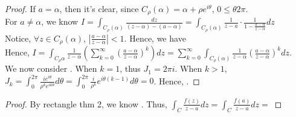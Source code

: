 \documentclass[12pt,a4paper]{article}
\begin{document}
\begin{proof}
  If $a = \alpha$, then it's clear, since $C_\rho(\alpha) = \alpha + \rho e^{i \theta}$, $0 \leq \theta 2\pi$. \\

  \noindent For $a \neq \alpha$, we know $\boxed{I = \int_{C_\rho(\alpha)} \frac{dz}{(z - \alpha) - (a - \alpha)} = \int_{C_\rho(\alpha)} \frac{1}{z - a} \cdot \frac{1}{1 - \frac{a - \alpha}{z - \alpha}} dz}$ \\

  \noindent Notice, $\forall z \in C_\rho(\alpha)$, $|\frac{a - \alpha}{z - \alpha}| < 1$. Hence, we have  \\

  \noindent Hence, $I = \int_{C_\rho{\alpha}} \frac{1}{z - \alpha}(\sum_{k = 0}^\infty (\frac{a - \alpha}{z - \alpha})^k) dz = \sum_{k = 0}^\infty \int_{C_\rho(\alpha)} \frac{1}{z - \alpha} (\frac{a - \alpha}{z - \alpha})^k dz$. \\

  \noindent We now consider . When $k = 1$, thus $J_1 = 2\pi i$. When $k > 1$, $J_k = \int_0^{2\pi} \frac{i e^{i \theta}}{\rho^k e^{i k \theta}} d\theta = \int_0^{2\pi} \frac{i}{\rho^k} e^{i\theta(k - 1)} d\theta = 0$. Hence, .
\end{proof}


\begin{proof}
  By rectangle thm 2, we know . Thus, $\int_C \frac{f(z)}{z - a} dz = \int_C \frac{f(a)}{z - a} dz =$ 
\end{proof}

\vspace{1.0em}

\end{document}
